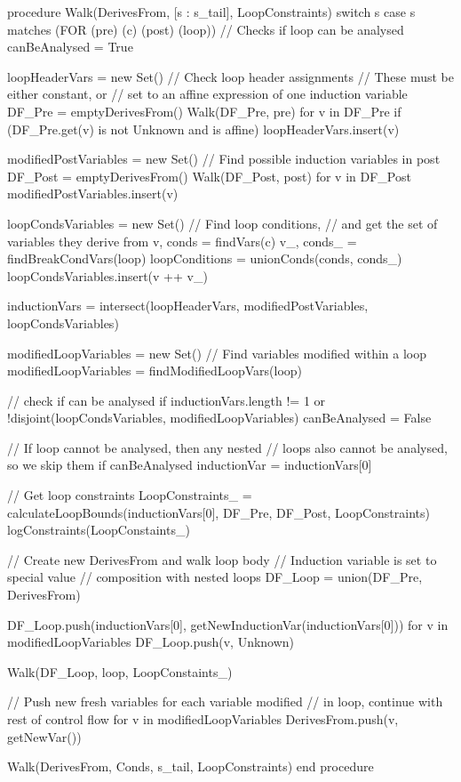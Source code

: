 \begin{sflisting}
  procedure Walk(DerivesFrom, [s : s_tail], LoopConstraints)
    switch s
      case s matches (FOR (pre) (c) (post) (loop))
        // Checks if loop can be analysed
        canBeAnalysed = True

        loopHeaderVars = new Set()
        // Check loop header assignments
        // These must be either constant, or 
        // set to an affine expression of one induction variable
        DF_Pre = emptyDerivesFrom()
        Walk(DF_Pre, pre)
        for v in DF_Pre
          if (DF_Pre.get(v) is not Unknown and is affine)
            loopHeaderVars.insert(v)

        modifiedPostVariables = new Set()
        // Find possible induction variables in post
        DF_Post = emptyDerivesFrom()
        Walk(DF_Post, post)
        for v in DF_Post
          modifiedPostVariables.insert(v)

        loopCondsVariables = new Set()
        // Find loop conditions, 
        // and get the set of variables they derive from
        v, conds = findVars(c)
        v_, conds_ = findBreakCondVars(loop)
        loopConditions = unionConds(conds, conds_)
        loopCondsVariables.insert(v ++ v_)

        inductionVars = intersect(loopHeaderVars, modifiedPostVariables, loopCondsVariables)

        modifiedLoopVariables = new Set()
        // Find variables modified within a loop
        modifiedLoopVariables = findModifiedLoopVars(loop)

        // check if can be analysed
        if inductionVars.length != 1 or !disjoint(loopCondsVariables, modifiedLoopVariables)
          canBeAnalysed = False

        // If loop cannot be analysed, then any nested
        // loops also cannot be analysed, so we skip them
        if canBeAnalysed
          inductionVar = inductionVars[0]

          // Get loop constraints
          LoopConstraints_ = calculateLoopBounds(inductionVars[0], DF_Pre, DF_Post, LoopConstraints)
          logConstraints(LoopConstaints_)

          // Create new DerivesFrom and walk loop body
          // Induction variable is set to special value 
          // composition with nested loops
          DF_Loop = union(DF_Pre, DerivesFrom)

          DF_Loop.push(inductionVars[0], getNewInductionVar(inductionVars[0]))
          for v in modifiedLoopVariables
            DF_Loop.push(v, Unknown)
          
          Walk(DF_Loop, loop, LoopConstaints_)

        // Push new fresh variables for each variable modified 
        // in loop, continue with rest of control flow
        for v in modifiedLoopVariables
          DerivesFrom.push(v, getNewVar())
        
        Walk(DerivesFrom, Conds, s_tail, LoopConstraints)
  end procedure 
\end{sflisting}

